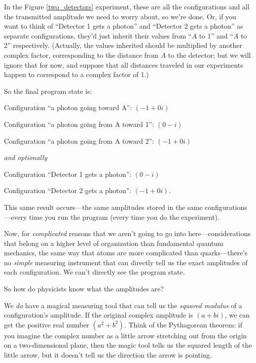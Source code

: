 {
 In the Figure \ref{two_detectors} experiment, these are all the configurations
and all the transmitted amplitude we need to worry about, so
we're done. Or, if you want to think of
``Detector 1 gets a photon'' and
``Detector 2 gets a photon'' as
separate configurations, they'd just inherit their
values from ``$A$ to 1'' and
``$A$ to 2'' respectively. (Actually,
the values inherited should be multiplied by another complex factor,
corresponding to the distance from $A$ to the detector; but we will
ignore that for now, and suppose that all distances traveled in our
experiments happen to correspond to a complex factor of 1.)}

{
 So the final program state is:}

{
 Configuration ``a photon going toward
A'': $(-1 + 0i)$}

{
 Configuration ``a photon going from A toward
1'': $(0 - i)$}

{
 Configuration ``a photon going from A toward
2'': $(-1 + 0i)$}

{
 \textit{and optionally}}

{
 Configuration ``Detector 1 gets a
photon'': $(0 - i)$}

{
 Configuration ``Detector 2 gets a
photon'': $(-1 + 0i)$.}

{
 This same result occurs---the same amplitudes stored in the same
configurations---every time you run the program (every time you do the
experiment).}

{
 Now, for \textit{complicated} reasons that we
aren't going to go into here---considerations that
belong on a higher level of organization than fundamental quantum
mechanics, the same way that atoms are more complicated than
quarks---there's no \textit{simple} measuring
instrument that can directly tell us the exact amplitudes of each
configuration. We can't directly see the program
state.}

{
 So how do physicists know what the amplitudes are?}

{
 We \textit{do} have a magical measuring tool that can tell us the
\textit{squared modulus} of a configuration's
amplitude. If the original complex amplitude is $(a + bi)$, we can get
the positive real number $(a^{2} + b^{2})$.
Think of the Pythagorean theorem: if you imagine the complex number as
a little arrow stretching out from the origin on a two-dimensional
plane, then the magic tool tells us the squared length of the little
arrow, but it doesn't tell us the direction the arrow
is pointing.}

